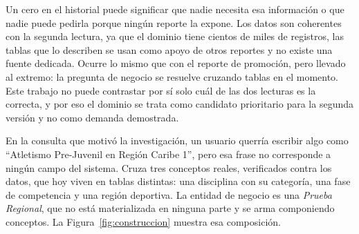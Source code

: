 \documentclass[11pt,letterpaper]{article}
\numberwithin{equation}{section}
\begin{document}
Un cero en el historial puede significar que nadie necesita esa información o que nadie puede pedirla porque ningún reporte la expone. Los datos son coherentes con la segunda lectura, ya que el dominio tiene cientos de miles de registros, las tablas que lo describen se usan como apoyo de otros reportes y no existe una fuente dedicada. Ocurre lo mismo que con el reporte de promoción, pero llevado al extremo: la pregunta de negocio se resuelve cruzando tablas en el momento. Este trabajo no puede contrastar por sí solo cuál de las dos lecturas es la correcta, y por eso el dominio se trata como candidato prioritario para la segunda versión y no como demanda demostrada.

En la consulta que motivó la investigación, un usuario querría escribir algo como ``Atletismo Pre-Juvenil en Región Caribe 1'', pero esa frase no corresponde a ningún campo del sistema. Cruza tres conceptos reales, verificados contra los datos, que hoy viven en tablas distintas: una disciplina con su categoría, una fase de competencia y una región deportiva. La entidad de negocio es una \emph{Prueba Regional}, que no está materializada en ninguna parte y se arma componiendo conceptos. La Figura~\ref{fig:construccion} muestra esa composición.
\end{document}
